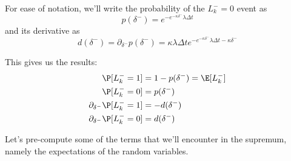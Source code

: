 \documentclass[12pt]{article}
\begin{document}
For ease of notation, we'll write the probability of the $L_k^- = 0$ event as
\[ p(\delta^-) = e^{- e^{-\kappa \delta^-} \lambda \Delta t} \]
and its derivative as
\[ d(\delta^-) = \partial_{\delta^-} p(\delta^-) = \kappa \lambda \Delta t e^{-e^{-\kappa \delta^-} \lambda \Delta t - \kappa \delta^-} \]

This gives us the results:
\begin{align*}
\P [ L_k^- = 1] & = 1 - p(\delta^-) = \E [ L_k^-] \\
\P [ L_k^- = 0] & = p(\delta^-) \\
\partial_{\delta^-} \P [ L_k^- = 1]  & = -d(\delta^-) \\
\partial_{\delta^-} \P [ L_k^- = 0] & = d(\delta^-) \\
\end{align*}

Let's pre-compute some of the terms that we'll encounter in the supremum, namely the expectations of the random variables. 
\end{document}
